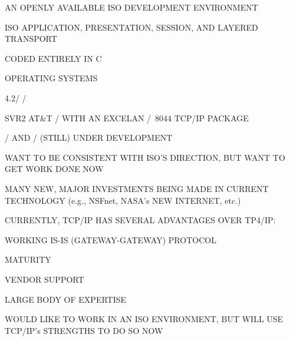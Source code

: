 \begin{bwslide}

\begin{nrtc}
\item	AN OPENLY AVAILABLE ISO DEVELOPMENT ENVIRONMENT

\item	ISO APPLICATION, PRESENTATION, SESSION, AND LAYERED TRANSPORT

\item	CODED ENTIRELY IN C

\item	OPERATING SYSTEMS
    \begin{nrtc}
    \item	4.2\bsd/ \unix/

    \item	SVR2 AT\&T \unix/ WITH AN EXCELAN \exos/~8044 TCP/IP PACKAGE

    \item	\vms/ AND \pcdos/ (STILL) UNDER DEVELOPMENT
    \end{nrtc}
\end{nrtc}
\end{bwslide}


\begin{bwslide}

\begin{nrtc}
\item	WANT TO BE CONSISTENT WITH ISO'S DIRECTION,
	BUT WANT TO GET WORK DONE NOW
    \begin{nrtc}
    \item	MANY NEW, MAJOR INVESTMENTS BEING MADE IN CURRENT TECHNOLOGY
		(e.g., NSFnet, NASA's NEW INTERNET, etc.)
    \end{nrtc}

\item	CURRENTLY, TCP/IP HAS SEVERAL ADVANTAGES OVER TP4/IP:
    \begin{nrtc}
    \item	WORKING IS-IS (GATEWAY-GATEWAY) PROTOCOL

    \item	MATURITY

    \item	VENDOR SUPPORT

    \item	LARGE BODY OF EXPERTISE
    \end{nrtc}

\item	WOULD LIKE TO WORK IN AN ISO ENVIRONMENT,
	BUT WILL USE TCP/IP's STRENGTHS TO DO SO NOW
\end{nrtc}
\end{bwslide}


